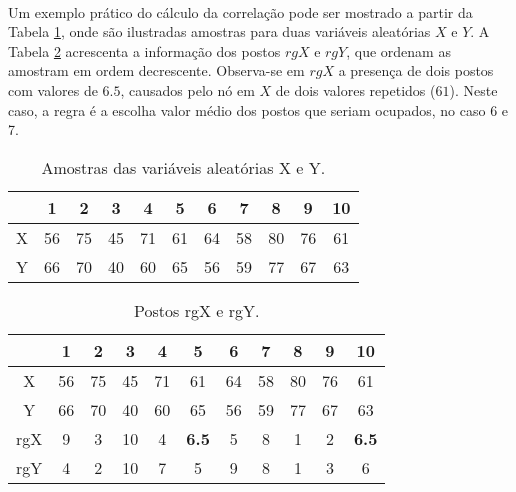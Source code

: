 \paragraph{} Um exemplo prático do cálculo da correlação pode ser mostrado a partir da Tabela \ref{tab:1}, onde são ilustradas amostras para duas variáveis aleatórias \begin{math}X\end{math} e \begin{math}Y\end{math}. A Tabela \ref{tab:2} acrescenta a informação dos postos \begin{math}rgX\end{math} e \begin{math}rgY\end{math}, que ordenam as amostram em ordem decrescente. Observa-se em \begin{math}rgX\end{math} a presença de dois postos com valores de \begin{math}6.5\end{math}, causados pelo nó em \begin{math}X\end{math} de dois valores repetidos (\begin{math}61\end{math}). Neste caso, a regra é a escolha valor médio dos postos que seriam ocupados, no caso 6 e 7.

\begin{table}[h!]
    \begin{center}
        \begin{tabular}{ c|cccccccccc }
            & 1 & 2 & 3 & 4 & 5 & 6 & 7 & 8 & 9 & 10 \\
            \hline
            X & 56 & 75 & 45 & 71 & 61 & 64 & 58 & 80 & 76 & 61 \\
            Y & 66 & 70 & 40 & 60 & 65 & 56 & 59 & 77 & 67 & 63 \\
        \end{tabular}
        \caption{Amostras das variáveis aleatórias X e Y.}
        \label{tab:1}
    \end{center}
\end{table}

\begin{table}[h!]
    \begin{center}
        \begin{tabular}{ c|cccccccccc }
            & 1 & 2 & 3 & 4 & 5 & 6 & 7 & 8 & 9 & 10 \\
            \hline
            X & 56 & 75 & 45 & 71 & 61 & 64 & 58 & 80 & 76 & 61 \\
            Y & 66 & 70 & 40 & 60 & 65 & 56 & 59 & 77 & 67 & 63 \\
            \hline
            rgX & 9 & 3 & 10 & 4 & \textbf{6.5} & 5 & 8 & 1 & 2 & \textbf{6.5} \\
            rgY & 4 & 2 & 10 & 7 & 5 & 9 & 8 & 1 & 3 & 6 \\
        \end{tabular}
        \caption{Postos rgX e rgY.}
        \label{tab:2}
    \end{center}
\end{table}

